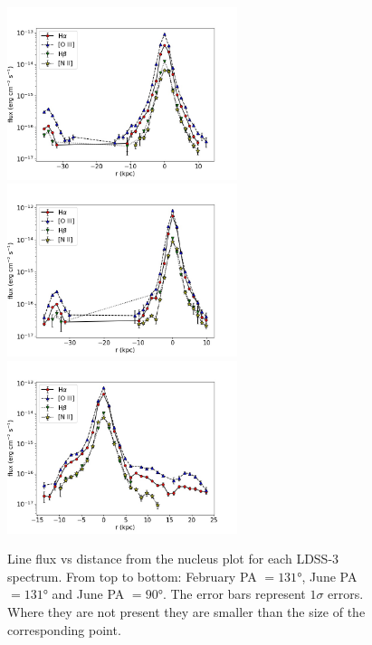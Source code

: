\documentclass[../thesis.tex]{subfiles}
\begin{document}
\begin{figure}
\centering
\includegraphics[width=0.6\textwidth]{images/paper3/PA131_2016_line_flux.jpg}\\ 
\includegraphics[width=0.6\textwidth]{images/paper3/PA131_line_flux.jpg}\\ 
\includegraphics[width=0.6\textwidth]{images/paper3/PA90_line_flux.jpg}\\ 
\caption[]{Line flux vs distance from the nucleus plot for each LDSS-3 spectrum. From top to bottom: February PA $=\ang{131}$, June PA $=\ang{131}$ and June PA $=\ang{90}$. The error bars represent $1\sigma$ errors. Where they are not present they are smaller than the size of the corresponding point.} 
\label{fig:line_fluxes}
\end{figure} 
\end{document}
